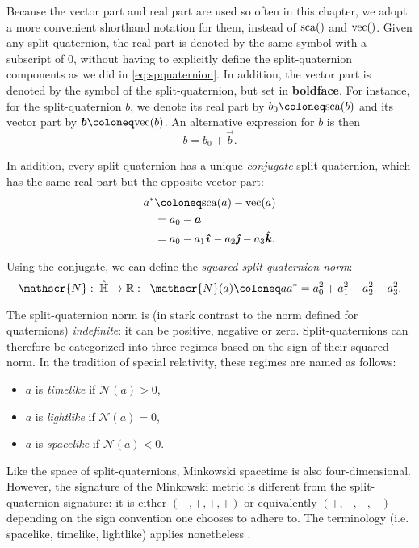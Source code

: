 
Because the vector part and real part are used so often in this chapter, we adopt a more convenient shorthand notation for them, instead of $\mathrm{sca}\qty()$ and $\mathrm{vec}\qty()$. Given any split-quaternion, the real part is denoted by the same symbol with a subscript of 0, without having to explicitly define the split-quaternion components as we did in \cref{eq:spquaternion}. In addition, the vector part is denoted by the symbol of the split-quaternion, but set in \textbf{boldface}. For instance, for the split-quaternion $b$, we denote its real part by $b_0 \coloneq \scapart{b}$ and its vector part by $\vec{b} \coloneq \vecpart{b}$. An alternative expression for $b$ is then
\begin{equation}
     b = b_0 + \vec{b}.
\end{equation}

In addition, every split-quaternion has a unique \emph{conjugate} split-quaternion, which has the same real part but the opposite vector part:
\begin{equation}
    \begin{split}
     \conj{a} &\coloneq \scapart{a} - \vecpart{a} \\
              &= a_0 - \vec{a}  \\
              &= a_0 - a_1\quati - a_2\quatj - a_3\quatk.
     \end{split}
\end{equation}

Using the conjugate, we can define the \emph{squared split-quaternion norm}:
\begin{equation}
    \mathscr{N}:\;\spquaternions \to \real:\;\;\mathscr{N}(a) \coloneq a\conj{a} = a_0^2 + a_1^2 - a_2^2 - a_3^2. 
    \label{eq:quat_norm}
\end{equation}

The split-quaternion norm is (in stark contrast to the norm defined for quaternions) \emph{indefinite}: it can be positive, negative or zero. Split-quaternions can therefore be categorized into three regimes based on the sign of their squared norm. In the tradition of special relativity, these regimes are named as follows:
\begin{itemize}
    \item $a$ is \emph{timelike} if \( \mathscr{N}(a) > 0 \),
    \item $a$ is \emph{lightlike} if \( \mathscr{N}(a) = 0 \), 
    \item $a$ is \emph{spacelike} if \( \mathscr{N}(a) < 0 \).
\end{itemize}
Like the space of split-quaternions, Minkowski spacetime is also four-dimensional. However, the signature of the Minkowski metric is different from the split-quaternion signature: it is either \((-, +, +, +)\) or equivalently \( (+, -, -, -)\) depending on the sign convention one chooses to adhere to. The terminology (i.e. spacelike, timelike, lightlike) applies nonetheless \cite{Misner1970,Landau1971}.

